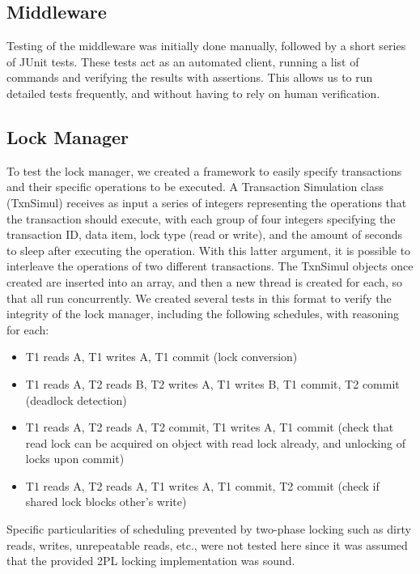 \documentclass[11pt]{article}
\begin{document}
\subsection*{Middleware}

Testing of the middleware was initially done manually, followed by a short series of JUnit tests. These tests act as an automated client, running a list of commands and verifying the results with assertions. This allows us to run detailed tests frequently, and without having to rely on human verification.  \par

\subsection*{Lock Manager}

To test the lock manager, we created a framework to easily specify transactions and their specific operations to be executed. A Transaction Simulation class (TxnSimul) receives as input a series of integers representing the operations that the transaction should execute, with each group of four integers specifying the transaction ID, data item, lock type (read or write), and the amount of seconds to sleep after executing the operation. With this latter argument, it is possible to interleave the operations of two different transactions. The TxnSimul objects once created are inserted into an array, and then a new thread is created for each, so that all run concurrently. We created several tests in this format to verify the integrity of the lock manager, including the following schedules, with reasoning for each:

\begin{itemize}
\item T1 reads A, T1 writes A, T1 commit (lock conversion)
\item T1 reads A, T2 reads B, T2 writes A, T1 writes B, T1 commit, T2 commit (deadlock detection)
\item T1 reads A, T2 reads A, T2 commit, T1 writes A, T1 commit (check that read lock can be acquired on object with read lock already, and unlocking of locks upon commit)
\item T1 reads A, T2 reads A, T1 writes A, T1 commit, T2 commit (check if shared lock blocks other's write)
\end{itemize}

Specific particularities of scheduling prevented by two-phase locking such as dirty reads, writes, unrepeatable reads, etc., were not tested here since it was assumed that the provided 2PL locking implementation was sound. \par
\end{document}
